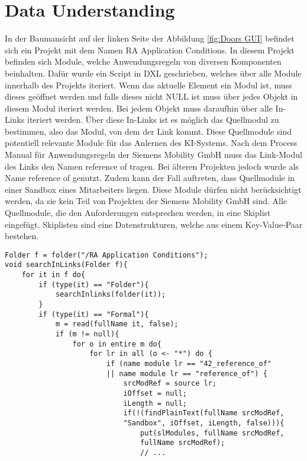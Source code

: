 \section{Data Understanding}

In der Baumansicht auf der linken Seite der Abbildung \ref*{fig:Doors GUI} befindet sich ein Projekt mit dem Namen \glqq RA Application Conditions\grqq{}. In diesem Projekt befinden sich Module, welche
Anwendungsregeln von diversen Komponenten beinhalten. Dafür wurde ein Script in \ac*{DXL} geschrieben, welches über alle Module innerhalb des Projekts iteriert. Wenn das aktuelle Element ein Modul ist,
muss dieses geöffnet werden und falls dieses nicht NULL ist muss über jedes Objekt in diesem Modul iteriert werden. Bei jedem Objekt muss daraufhin über alle In-Links iteriert werden. Über diese 
In-Links ist es möglich das Quellmodul zu bestimmen, also das Modul, von dem der Link kommt. Diese Quellmodule sind potentiell relevante Module für das Anlernen des KI-Systems. Nach dem Process Manual für
Anwendungsregeln der Siemens Mobility GmbH \cite[S.32]{q2} muss das Link-Modul des Links den Namen  reference of\grqq{} tragen. Bei älteren Projekten jedoch wurde als Name 
\glqq reference of\grqq{} genutzt. Zudem kann der Fall auftreten, dass Quellmodule in einer Sandbox eines Mitarbeiters liegen. Diese Module dürfen nicht berücksichtigt werden, da sie kein Teil
von Projekten der Siemens Mobility GmbH sind. Alle Quellmodule, die den Anforderungen entsprechen werden, in eine Skiplist eingefügt. Skiplisten sind eine Datenstrukturen, welche aus einem 
Key-Value-Paar bestehen. 

\begin{lstlisting}[caption={Iterieren über alle Module von RA Application Conditions},captionpos=b, label = lst:searchInLinks]
Folder f = folder("/RA Application Conditions");
void searchInLinks(Folder f){
    for it in f do{
        if (type(it) == "Folder"){
            searchInlinks(folder(it));
        }
        if (type(it) == "Formal"){
            m = read(fullName it, false);
            if (m != null){
                for o in entire m do{
                    for lr in all (o <- "*") do {
                        if (name module lr == "42_reference_of" 
                        || name module lr == "reference_of") {
                            srcModRef = source lr;
                            iOffset = null;
                            iLength = null;
                            if(!(findPlainText(fullName srcModRef, 
                            "Sandbox", iOffset, iLength, false))){
                                put(slModules, fullName srcModRef, 
                                fullName srcModRef);
                                // ...
\end{lstlisting}

